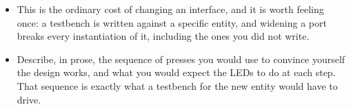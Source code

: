 \begin{parts}
\begin{itemize}
        what precisely GHDL will complain about when you try.
      \item This is the ordinary cost of changing an interface, and it is worth feeling once: a
        testbench is written against a specific entity, and widening a port breaks every
        instantiation of it, including the ones you did not write.
      \item Describe, in prose, the sequence of presses you would use to convince yourself the
        design works, and what you would expect the LEDs to do at each step. That sequence is
        exactly what a testbench for the new entity would have to drive.
    \end{itemize}
\end{parts}
